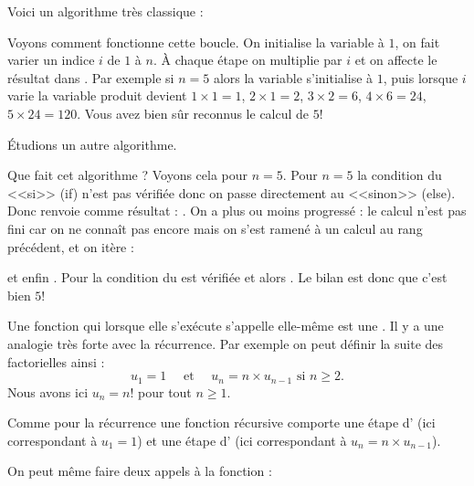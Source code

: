 \documentclass[class=report,crop=false]{standalone}
\begin{document}
Voici un algorithme très classique :


Voyons comment fonctionne cette boucle.
On initialise la variable  à $1$,
on fait varier un indice $i$ de $1$ à $n$. \`A chaque étape on multiplie 
par $i$ et on affecte le résultat dans . Par exemple si $n=5$ alors
la variable  s'initialise à $1$, puis lorsque $i$ varie la variable produit devient
$1 \times 1 = 1$, $2 \times 1 = 2$, $3 \times 2 = 6$, $4\times 6 = 24$, $5 \times 24 = 120$.
Vous avez bien sûr reconnus le calcul de $5!$

\bigskip

\'Etudions un autre algorithme.


Que fait cet algorithme ? Voyons cela pour $n=5$.
Pour $n=5$ la condition du <<si>> (if) n'est pas vérifiée donc on passe directement au <<sinon>> (else).
Donc  renvoie comme résultat : .
On a plus ou moins progressé : le calcul n'est pas fini car on ne connaît pas encore 
mais on s'est ramené à un calcul au rang précédent, et on itère :

et enfin .
Pour  la condition du  est vérifiée
et alors  .
Le bilan est donc que 
c'est bien $5!$


Une fonction qui lorsque elle s’exécute s'appelle elle-même est une .
Il y a une analogie très forte avec la récurrence.
Par exemple on peut définir la suite des factorielles ainsi :
$$u_1 = 1 \quad \text{ et } \quad u_{n} = n \times u_{n-1} \text{ si } n \ge 2.$$
Nous avons ici $u_n = n!$ pour tout $n\ge 1$.

Comme pour la récurrence une fonction récursive comporte une étape d'
(ici  correspondant à $u_1=1$)
et une étape d' (ici  correspondant à $u_{n} = n \times u_{n-1}$).

\bigskip

On peut même faire deux appels à la fonction :
\end{document}
